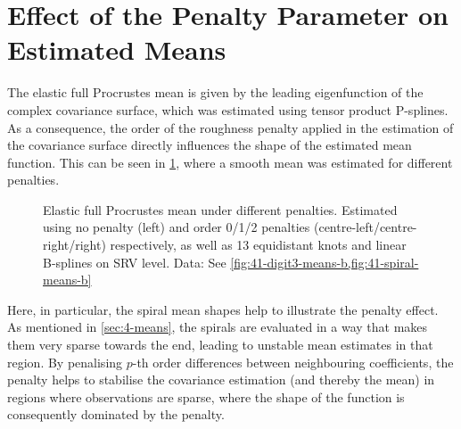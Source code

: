 \section{Effect of the Penalty Parameter on Estimated Means}
\label{sec:4-penalty}
The elastic full Procrustes mean is given by the leading eigenfunction of the complex covariance surface, which was estimated using tensor product P-splines.
As a consequence, the order of the roughness penalty applied in the estimation of the covariance surface directly influences the shape of the estimated mean function.
This can be seen in \cref{fig:4-penalty}, where a smooth mean was estimated for different penalties.
\begin{figure}
  \centering
  \begin{subfigure}{\textwidth}
  \end{subfigure}
  \begin{subfigure}{\textwidth}
  \end{subfigure}
  \caption{Elastic full Procrustes mean under different penalties.
  Estimated using no penalty (left) and order 0/1/2 penalties (centre-left/centre-right/right) respectively, as well as 13 equidistant knots and linear B-splines on SRV level.
  Data: See \cref{fig:41-digit3-means-b,fig:41-spiral-means-b}}
  \label{fig:4-penalty}
\end{figure}
Here, in particular, the spiral mean shapes help to illustrate the penalty effect.
As mentioned in \cref{sec:4-means}, the spirals are evaluated in a way that makes them very sparse towards the end, leading to unstable mean estimates in that region.
By penalising $p$-th order differences between neighbouring coefficients, the penalty helps to stabilise the covariance estimation (and thereby the mean) in regions where observations are sparse, where the shape of the function is consequently dominated by the penalty.

